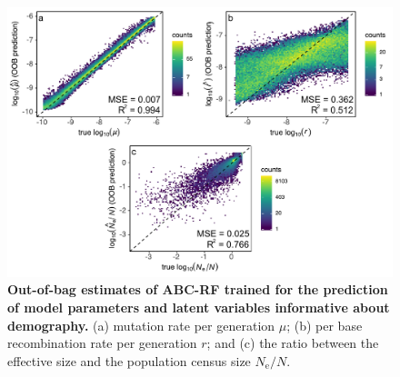 \documentclass[a4paper, 12pt]{article}
\begin{document}
\begin{figure}[ht]
  \centering
  \includegraphics[width=1\textwidth]{Figures/FigureS3_oob_plots_demography.pdf}
  \small\caption{\textbf{Out-of-bag estimates of ABC-RF trained for the prediction of model parameters and latent variables informative about demography.} (a) mutation rate per generation $\mu$; (b) per base recombination rate per generation $r$; and (c) the ratio between the effective size and the population census size $N_{\mathrm{e}}/N$.}\label{fig:supple_oob_demo}
\end{figure}
\end{document}
